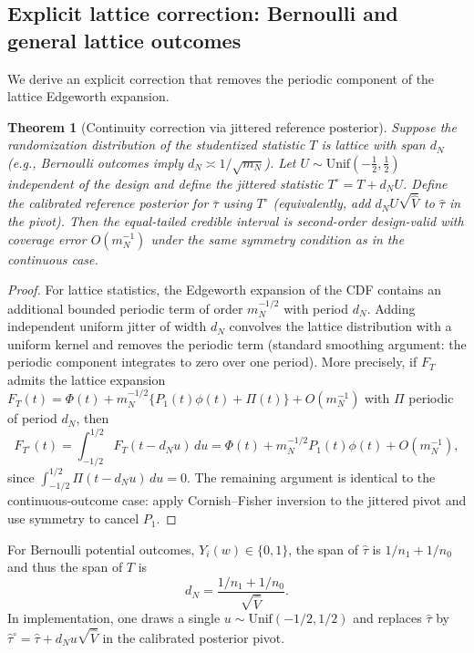 \documentclass[aos]{imsart}
\newtheorem{theorem}{Theorem}
\theoremstyle{definition}
\theoremstyle{plain}
\begin{document}
\subsection{Explicit lattice correction: Bernoulli and general lattice outcomes}\label{app:lattice}

We derive an explicit correction that removes the periodic component of the lattice Edgeworth expansion.

\begin{theorem}[Continuity correction via jittered reference posterior]\label{thm:lattice-proof}
Suppose the randomization distribution of the studentized statistic $T$ is lattice with span $d_N$ (e.g., Bernoulli outcomes imply $d_N\asymp 1/\sqrt{m_N}$).
Let $U\sim\mathrm{Unif}(-\tfrac12,\tfrac12)$ independent of the design and define the jittered statistic $T^\circ=T+d_N U$.
Define the calibrated reference posterior for $\bar\tau$ using $T^\circ$ (equivalently, add $d_NU\sqrt{\hat V}$ to $\hat\tau$ in the pivot).
Then the equal-tailed credible interval is second-order design-valid with coverage error $O(m_N^{-1})$ under the same symmetry condition as in the continuous case.
\end{theorem}

\begin{proof}
For lattice statistics, the Edgeworth expansion of the CDF contains an additional bounded periodic term of order $m_N^{-1/2}$ with period $d_N$.
Adding independent uniform jitter of width $d_N$ convolves the lattice distribution with a uniform kernel and removes the periodic term
(standard smoothing argument: the periodic component integrates to zero over one period).
More precisely, if $F_T$ admits the lattice expansion $F_T(t)=\Phi(t)+m_N^{-1/2}\{P_1(t)\phi(t)+\Pi(t)\}+O(m_N^{-1})$
with $\Pi$ periodic of period $d_N$, then
\[
F_{T^\circ}(t)=\int_{-1/2}^{1/2} F_T(t-d_N u)\,du
=\Phi(t)+m_N^{-1/2} P_1(t)\phi(t)+O(m_N^{-1}),
\]
since $\int_{-1/2}^{1/2}\Pi(t-d_Nu)\,du=0$.
The remaining argument is identical to the continuous-outcome case: apply Cornish--Fisher inversion to the jittered pivot and use symmetry to cancel $P_1$.
\end{proof}

For Bernoulli potential outcomes, $Y_i(w)\in\{0,1\}$, the span of $\hat\tau$ is $1/n_1+1/n_0$ and thus the span of $T$ is
\[
d_N=\frac{1/n_1+1/n_0}{\sqrt{\hat V}}.
\]
In implementation, one draws a single $u\sim\mathrm{Unif}(-1/2,1/2)$ and replaces $\hat\tau$ by $\hat\tau^\circ=\hat\tau+d_N u\sqrt{\hat V}$ in the calibrated posterior pivot.
\end{document}
